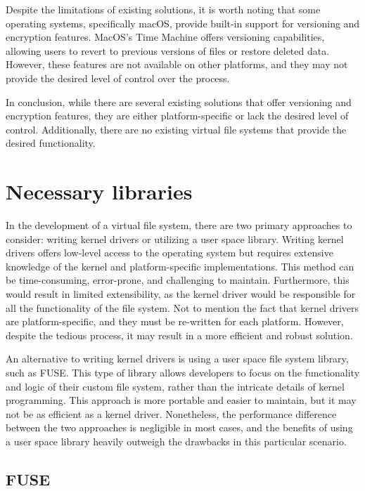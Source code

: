 Despite the limitations of existing solutions, it is worth noting that some operating systems, specifically macOS, provide built-in support for versioning and encryption features.
MacOS's Time Machine offers versioning capabilities, allowing users to revert to previous versions of files or restore deleted data.
However, these features are not available on other platforms, and they may not provide the desired level of control over the process.

In conclusion, while there are several existing solutions that offer versioning and encryption features, they are either platform-specific or lack the desired level of control.
Additionally, there are no existing virtual file systems that provide the desired functionality.


\section{Necessary libraries}\label{sec:libs}


In the development of a virtual file system, there are two primary approaches to consider: writing kernel drivers or utilizing a user space library.
Writing kernel drivers offers low-level access to the operating system but requires extensive knowledge of the kernel and platform-specific implementations.
This method can be time-consuming, error-prone, and challenging to maintain.
Furthermore, this would result in limited extensibility, as the kernel driver would be responsible for all the functionality of the file system.
Not to mention the fact that kernel drivers are platform-specific, and they must be re-written for each platform.
However, despite the tedious process, it may result in a more efficient and robust solution.

An alternative to writing kernel drivers is using a user space file system library, such as FUSE\@.
This type of library allows developers to focus on the functionality and logic of their custom file system, rather than the intricate details of kernel programming.
This approach is more portable and easier to maintain, but it may not be as efficient as a kernel driver.
Nonetheless, the performance difference between the two approaches is negligible in most cases, and the benefits of using a user space library heavily outweigh the drawbacks in this particular scenario.

\subsection{FUSE}\label{subsec:fuse}

